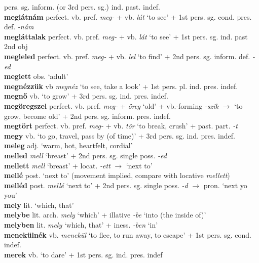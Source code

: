 \documentclass[11pt]{article}
\begin{document}
pers. sg. inform. (or 3rd pers. sg.) ind. past. indef. \\
\textbf{meglátnám} perfect. vb. pref. \emph{meg-} + vb. \emph{lát}
`to see' + 1st pers. sg. cond. pres. def. \emph{-nám} \\
\textbf{megláttalak} perfect. vb. pref. \emph{meg-} + vb. \emph{lát}
`to see' + 1st pers. sg. ind. past 2nd obj \\
\textbf{megleled} perfect. vb. pref. \emph{meg-} + vb. \emph{lel} `to
find' + 2nd pers. sg. inform. def. \emph{-ed} \\
\textbf{meglett} obs. `adult' \\
\textbf{megnézzük} vb \emph{megnéz} `to see, take a look' + 1st
pers. pl. ind. pres. indef. \\
\textbf{megnő} vb. `to grow' + 3rd pers. sg. ind. pres. indef. \\
\textbf{megöregszel} perfect. vb. pref. \emph{meg-} +
\emph{öreg} `old' + vb.\hyp{}forming \emph{-szik}
$\rightarrow$ `to grow, become old' + 2nd
pers. sg. inform. pres. indef. \\
\textbf{megtört} perfect. vb. pref. \emph{meg-} + vb. \emph{tör} `to
    break, crush' + past. part. \emph{-t} \\
\textbf{megy} vb. `to go, travel, pass by (of time)' + 3rd
pers. sg. ind. pres. indef. \\
\textbf{meleg} adj. `warm, hot, heartfelt, cordial' \\
\textbf{melled} \emph{mell} `breast' + 2nd pers. sg. single
poss. \emph{-ed} \\
\textbf{mellett} \emph{mell} `breast' + locat. \emph{-ett}
$\rightarrow$ `next to' \\
\textbf{mellé} post. `next to' (movement implied, compare
with locative \emph{mellett}) \\
\textbf{melléd} post. \emph{mellé} `next to' + 2nd pers. sg. single
  poss. \emph{-d} $\rightarrow$ pron. `next yo you' \\
\textbf{mely} lit. `which, that' \\
\textbf{melybe} lit. arch. \emph{mely} `which' + illative \emph{-be}
`into (the inside of)' \\
\textbf{melyben} lit. \emph{mely} `which, that' + iness. \emph{-ben}
`in' \\
\textbf{menekülnék} vb. \emph{menekül} `to flee, to run away, to
escape' + 1st pers. sg. cond. indef. \\
\textbf{merek} vb. \emph{} `to dare' + 1st pers. sg. ind. pres. indef \\
\end{document}
